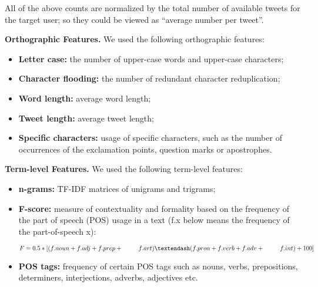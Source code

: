 \documentclass[10pt, a4paper]{article}
\newcommand{\blank}[1]{\hspace*{#1}}
\begin{document}
\vspace{1mm}
All of the above counts are normalized by the total number of available tweets
for the target user; so they could be viewed as “average number per tweet”.
\par\vspace{3mm}
\textbf{Orthographic Features.} We used the following orthographic features:
\begin{itemize}[noitemsep,nolistsep] 
\vspace{1mm}
\item \textbf{Letter case:} the number of upper-case words and upper-case characters;
\vspace{1mm} 
\item \textbf{Character flooding:} the number of redundant character reduplication;
\vspace{1mm} 
\item \textbf{Word length:} average word length;
\vspace{1mm} 
\item \textbf{Tweet length:} average tweet length;
\vspace{1mm} 
\item \textbf{Specific characters:} usage of specific characters, such as the number of occurrences of the exclamation points, question marks or apostrophes.
\end{itemize}
\par\vspace{3mm}
\textbf{Term-level Features.} We used the following term-level features:
\begin{itemize}[noitemsep,nolistsep]
\vspace{1mm}
\item \textbf{n-grams:} TF-IDF matrices of unigrams and trigrams;
\vspace{1mm}
\item \textbf{F-score:} measure of contextuality and formality based on the frequency of the part of speech (POS) usage in a text (f.x below means the frequency of the part-of-speech x): 
\vspace{2mm}
\begin{spacing}{0.8}
\blank{0.2cm}$F =  0.5 * [(f.noun + f.adj + f.prep + \\
		\blank{0.9cm} f.art) – (f.pron + f.verb + f.adv +\\
		\blank{0.9cm} f.int) + 100] $
\end{spacing}
\item \textbf{POS tags:} frequency of certain POS tags such as nouns, verbs, prepositions, determiners, interjections, adverbs, adjectives etc.\\
\end{itemize}
\end{document}
